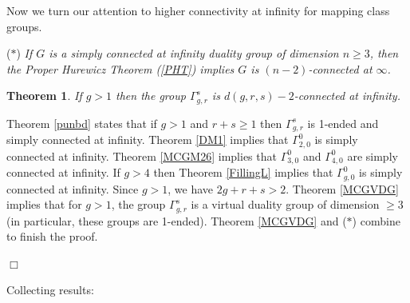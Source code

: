 \documentclass[12pt]{article}
\newtheorem{theorem}{Theorem}[subsection]
\newenvironment{proof}{\addvspace{12pt}\noindent{\bf Proof:}}{
$\Box$\par\addvspace{12pt}}
\begin{document}
Now we turn our attention to higher connectivity at infinity for mapping class groups. 

\medskip

\noindent ($\ast$) {\it If $G$ is a simply connected at infinity duality group of dimension $n\geq 3$, then the Proper Hurewicz Theorem (\ref{PHT}) implies $G$ is $(n-2)$-connected at $\infty$.} 
  
\begin{theorem} \label{MCGSC}  If $g>1$ then the group $\Gamma_{g,r}^s$ is $d(g,r,s)-2$-connected at infinity.  
 \end{theorem} 
 \begin{proof} 
 Theorem \ref{punbd} states that if $g>1$ and $r+s\geq 1$ then $\Gamma_{g, r}^s$ is 1-ended and simply connected at infinity. Theorem \ref{DM1} implies that $\Gamma_{2,0}^0$ is simply connected at infinity. Theorem \ref{MCGM26} implies that $\Gamma_{3,0}^0$ and $\Gamma_{4,0}^0$ are simply connected at infinity. 
 If $g>4$ then Theorem \ref{FillingL} implies that $\Gamma_{g,0}^0$ is simply connected at infinity. Since $g>1$, we have $2g+r+s>2$. Theorem \ref{MCGVDG} implies that for $g>1$, the group $\Gamma_{g,r}^s$ is a virtual duality group of dimension $\geq 3$ (in particular, these groups are 1-ended). 
 Theorem \ref{MCGVDG} and ($\ast$) combine to finish the proof.
 \end{proof}
 
 Collecting results:
 
\end{document}
